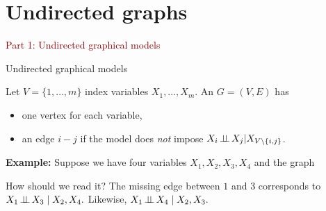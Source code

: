 \documentclass[dvipsnames,aspectratio=169,handout]{beamer}
\begin{document}

\section{Undirected graphs}

\begin{frame}{}
\begin{center}
{\Huge \textcolor{DarkRed}{Part 1: Undirected graphical models}}
\end{center}
\end{frame}

\begin{frame}{Undirected graphical models}
\begin{block}{}
Let $V=\{1,\ldots,m\}$ index variables $X_1,\ldots,X_m$.
An  $G=(V,E)$ has
\begin{itemize}
    \item one vertex for each variable,
    \item an edge $i-j$ if the model does \emph{not} impose $X_i\mbox{\,$\perp\!\!\!\perp$\,} X_j|X_{V\setminus \{i,j\}}$.
\end{itemize}	
\end{block}

\textbf{Example: }Suppose we have four variables $X_1,X_2,X_3,X_4$ and the graph

\begin{center}
\end{center}

\begin{alertblock}{How should we read it?}
The missing edge between $1$ and $3$ corresponds to
$
X_1 \mbox{\,$\perp\!\!\!\perp$\,} X_3 \mid X_2,X_4.
$
Likewise,
$
X_1 \mbox{\,$\perp\!\!\!\perp$\,} X_4 \mid X_2,X_3.
$
\end{alertblock}

\end{frame}
\end{document}
